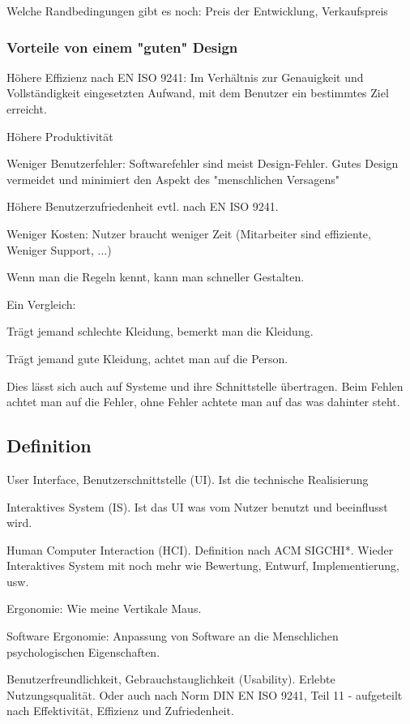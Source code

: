 \documentclass[a4paper]{article}
\begin{document}
Welche Randbedingungen gibt es noch: Preis der Entwicklung, Verkaufspreis


\subsubsection{Vorteile von einem "guten" Design}

Höhere Effizienz nach EN ISO 9241: Im Verhältnis zur Genauigkeit und Vollständigkeit eingesetzten Aufwand, mit dem Benutzer ein bestimmtes Ziel erreicht.

Höhere Produktivität

Weniger Benutzerfehler: Softwarefehler sind meist Design-Fehler. Gutes Design vermeidet und minimiert den Aspekt des "menschlichen Versagens"

Höhere Benutzerzufriedenheit evtl. nach EN ISO 9241.

Weniger Kosten: Nutzer braucht weniger Zeit (Mitarbeiter sind effiziente, Weniger Support, ...)

Wenn man die Regeln kennt, kann man schneller Gestalten.

Ein Vergleich:

Trägt jemand schlechte Kleidung, bemerkt man die Kleidung.

Trägt jemand gute Kleidung, achtet man auf die Person.

Dies lässt sich auch auf Systeme und ihre Schnittstelle übertragen. Beim Fehlen achtet man auf die Fehler, ohne Fehler achtete man auf das was dahinter steht.

\subsection{Definition}

User Interface, Benutzerschnittstelle (UI). Ist die technische Realisierung

Interaktives System (IS). Ist das UI was vom Nutzer benutzt und beeinflusst wird.

Human Computer Interaction (HCI). Definition nach ACM SIGCHI*. Wieder Interaktives System mit noch mehr wie Bewertung, Entwurf, Implementierung, usw.

Ergonomie: Wie meine Vertikale Maus.

Software Ergonomie: Anpassung von Software an die Menschlichen psychologischen Eigenschaften.

Benutzerfreundlichkeit, Gebrauchstauglichkeit (Usability). Erlebte Nutzungsqualität. Oder auch nach Norm DIN EN ISO 9241, Teil 11 - aufgeteilt nach Effektivität, Effizienz und Zufriedenheit.
\end{document}
